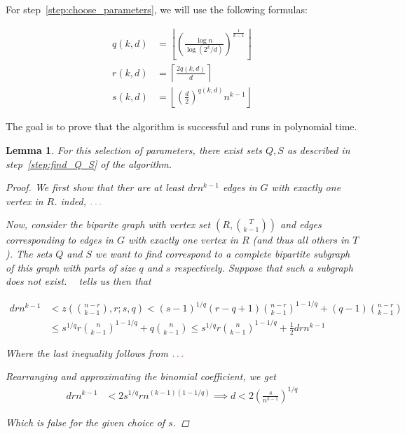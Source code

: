 \documentclass[12pt]{article}
\newtheorem{lemma}[thm]{Lemma}
\begin{document}
    For step~\ref{step:choose_parameters}, we will use the following formulas:

    \begin{align*}
            q(k, d) &= \left\lfloor \left(  \frac{\log n}{\log (2^k/d)} \right)^{\frac{1}{k-1}} \right\rfloor \\
            r(k, d) &= \left \lceil \frac{2q(k, d)}{d} \right \rceil \\
            s(k, d) &= \left\lfloor \left( \frac{d}{2} \right)^{q(k, d)} n^{k-1} \right\rfloor
    \end{align*}

    The goal is to prove that the algorithm is successful and runs in polynomial time.

    \begin{lemma}\label{lemma:q_s}
        For this selection of parameters,
        there exist sets $Q, S$ as described in step~\ref{step:find_Q_S} of the algorithm.

        \begin{proof}
            We first show that ther are at least $drn^{k-1}$ edges in $G$ with exactly one vertex in $R$.
            inded, $\color{red}\ldots$ %

            Now, consider the biparite graph with vertex set $\left( R, \binom{T}{k-1} \right)$
            and edges corresponding to edges in $G$ with exactly one vertex in $R$ (and thus all others in $T$).
            The sets $Q$ and $S$ we want to find correspond to a complete bipartite subgraph of this graph
            with parts of size $q$ and $s$ respectively.
            Suppose that such a subgraph does not exist.
            ~\cite{Kovari1954} tells us then that

            \begin{align*}\label{eq:equation}
                drn^{k-1} & < z\left(\binom{n-r}{k-1}, r; s, q  \right) < (s-1)^{1/q}(r-q+1)\binom{n-r}{k-1}^{1-1/q} + (q-1)\binom{n-r}{k-1} \\
                           & \leq s^{1/q} r \binom{n}{k-1}^{1-1/q} + q \binom{n}{k-1} \leq s^{1/q} r \binom{n}{k-1}^{1-1/q} + \frac{1}{2} drn^{k-1}
            \end{align*}

            Where the last inequality follows from $\color{red} \ldots$

            Rearranging and approximating the binomial coefficient, we get
            \begin{align*}
                drn^{k-1} &< 2s^{1/q}r n^{(k-1)(1-1/q)} \implies d < 2 \left( \frac{s}{n^{k-1}} \right)^{1/q}
            \end{align*}

            Which is false for the given choice of $s$.

        \end{proof}

    \end{lemma}
\end{document}
